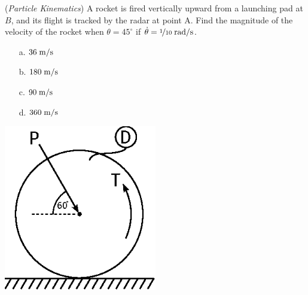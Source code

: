 \documentclass[addpoints, 12pt]{exam}
\begin{document}
\begin{questions}


\begin{minipage}{0.5\textwidth}
\question(\textit{Particle Kinematics})
A rocket is fired vertically upward from a launching pad at $B$, and its flight
is tracked by the radar at point A. Find the magnitude of the velocity of the 
rocket when $\theta = 45^\circ$ if $\dot{\theta} = \nicefrac{1}{10}\;
\unit[per-mode=symbol]{\radian\per\second}$. \\[0.5ex]

\begin{minipage}{0.3\textwidth}
    \begin{center}
    \begin{itemize}
        \setlength\itemsep{-0.4em}
        \item[a.] $36 \; \unit[per-mode=symbol]{\meter\per\second}$
        \item[b.] $180 \; \unit[per-mode=symbol]{\meter\per\second}$
    \end{itemize}
    \end{center}
\end{minipage}
\begin{minipage}{0.3\textwidth}
    \begin{center}
    \begin{itemize}
        \setlength\itemsep{-0.4em}
        \item[c.] $90 \; \unit[per-mode=symbol]{\meter\per\second}$
        \item[d.] $360 \; \unit[per-mode=symbol]{\meter\per\second}$
    \end{itemize}
    \end{center}
\end{minipage}

\end{minipage}
%
\begin{minipage}{0.5\textwidth}
    \centering
    \includegraphics[width=0.5\textwidth,valign=c]{./figures/question6.eps}
\end{minipage}


\end{questions}
\end{document}
